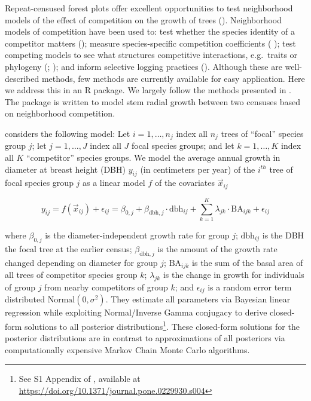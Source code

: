 \documentclass[12pt]{article}
\begin{document}
Repeat-censused forest plots offer excellent opportunities to test
neighborhood models of the effect of competition on the growth of trees
(\citet{canham_neighborhood_2004}). Neighborhood models of competition
have been used to: test whether the species identity of a competitor
matters (\citet{uriarte_spatially_2004}); measure species-specific
competition coefficients (\citet{das_effect_2012}
\citet{tatsumi_estimating_2016}); test competing models to see what
structures competitive interactions, e.g.~traits or phylogeny
(\citet{allen_permutation_2020}; \citet{uriarte_trait_2010}); and inform
selective logging practices (\citet{canham_neighborhood_2006}). Although
these are well-described methods, few methods are currently available
for easy application. Here we address this in an R package. We largely
follow the methods presented in \citet{allen_permutation_2020}. The
package is written to model stem radial growth between two censuses
based on neighborhood competition.

\citet{allen_permutation_2020} considers the following model: Let
\(i = 1, \ldots, n_j\) index all \(n_j\) trees of ``focal'' species
group \(j\); let \(j = 1, \ldots, J\) index all \(J\) focal species
groups; and let \(k = 1, \ldots, K\) index all \(K\) ``competitor''
species groups. We model the average annual growth in diameter at breast
height (DBH) \(y_{ij}\) (in centimeters per year) of the \(i^{th}\) tree
of focal species group \(j\) as a linear model \(f\) of the covariates
\(\vec{x}_{ij}\)

\begin{equation}
\label{eq:model}
y_{ij} = f(\vec{x}_{ij}) + \epsilon_{ij} = \beta_{0,j} + \beta_{\text{dbh},j} \cdot \text{dbh}_{ij} + \sum_{k=1}^{K} \lambda_{jk} \cdot \text{BA}_{ijk} + \epsilon_{ij}
\end{equation}

where \(\beta_{0,j}\) is the diameter-independent growth rate for group
\(j\); \(\text{dbh}_{ij}\) is the DBH the focal tree at the earlier
census; \(\beta_{\text{dbh},j}\) is the amount of the growth rate
changed depending on diameter for group \(j\); \(\text{BA}_{ijk}\) is
the sum of the basal area of all trees of competitor species group
\(k\); \(\lambda_{jk}\) is the change in growth for individuals of group
\(j\) from nearby competitors of group \(k\); and \(\epsilon_{ij}\) is a
random error term distributed \(\text{Normal}(0, \sigma^2)\). They
estimate all parameters via Bayesian linear regression while exploiting
Normal/Inverse Gamma conjugacy to derive closed-form solutions to all
posterior distributions\footnote{See S1 Appendix of
  \citet{allen_permutation_2020}, available at
  \url{https://doi.org/10.1371/journal.pone.0229930.s004}}. These
closed-form solutions for the posterior distributions are in contrast to
approximations of all posteriors via computationally expensive Markov
Chain Monte Carlo algorithms.
\end{document}
